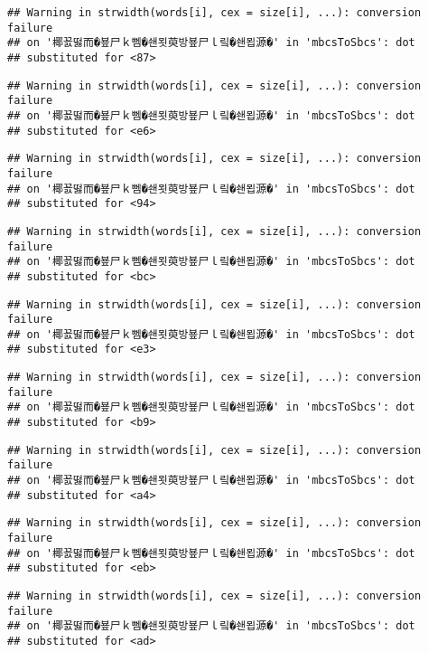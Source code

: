 \documentclass[]{article}
\begin{document}
\begin{verbatim}
## Warning in strwidth(words[i], cex = size[i], ...): conversion failure
## on '椰꾨떯而�뵾尸ｋ뻼�쇈묏萸방뵾尸ｌ맄�쇈묍源�' in 'mbcsToSbcs': dot
## substituted for <87>
\end{verbatim}

\begin{verbatim}
## Warning in strwidth(words[i], cex = size[i], ...): conversion failure
## on '椰꾨떯而�뵾尸ｋ뻼�쇈묏萸방뵾尸ｌ맄�쇈묍源�' in 'mbcsToSbcs': dot
## substituted for <e6>
\end{verbatim}

\begin{verbatim}
## Warning in strwidth(words[i], cex = size[i], ...): conversion failure
## on '椰꾨떯而�뵾尸ｋ뻼�쇈묏萸방뵾尸ｌ맄�쇈묍源�' in 'mbcsToSbcs': dot
## substituted for <94>
\end{verbatim}

\begin{verbatim}
## Warning in strwidth(words[i], cex = size[i], ...): conversion failure
## on '椰꾨떯而�뵾尸ｋ뻼�쇈묏萸방뵾尸ｌ맄�쇈묍源�' in 'mbcsToSbcs': dot
## substituted for <bc>
\end{verbatim}

\begin{verbatim}
## Warning in strwidth(words[i], cex = size[i], ...): conversion failure
## on '椰꾨떯而�뵾尸ｋ뻼�쇈묏萸방뵾尸ｌ맄�쇈묍源�' in 'mbcsToSbcs': dot
## substituted for <e3>
\end{verbatim}

\begin{verbatim}
## Warning in strwidth(words[i], cex = size[i], ...): conversion failure
## on '椰꾨떯而�뵾尸ｋ뻼�쇈묏萸방뵾尸ｌ맄�쇈묍源�' in 'mbcsToSbcs': dot
## substituted for <b9>
\end{verbatim}

\begin{verbatim}
## Warning in strwidth(words[i], cex = size[i], ...): conversion failure
## on '椰꾨떯而�뵾尸ｋ뻼�쇈묏萸방뵾尸ｌ맄�쇈묍源�' in 'mbcsToSbcs': dot
## substituted for <a4>
\end{verbatim}

\begin{verbatim}
## Warning in strwidth(words[i], cex = size[i], ...): conversion failure
## on '椰꾨떯而�뵾尸ｋ뻼�쇈묏萸방뵾尸ｌ맄�쇈묍源�' in 'mbcsToSbcs': dot
## substituted for <eb>
\end{verbatim}

\begin{verbatim}
## Warning in strwidth(words[i], cex = size[i], ...): conversion failure
## on '椰꾨떯而�뵾尸ｋ뻼�쇈묏萸방뵾尸ｌ맄�쇈묍源�' in 'mbcsToSbcs': dot
## substituted for <ad>
\end{verbatim}
\end{document}
